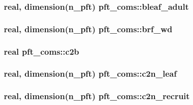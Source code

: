 \subsubsection[{bleaf\+\_\+adult}]{\setlength{\rightskip}{0pt plus 5cm}real, dimension(n\+\_\+pft) pft\+\_\+coms\+::bleaf\+\_\+adult}\label{namespacepft__coms_a032c88698720a94f7bdeff271ae39844}
\hypertarget{namespacepft__coms_aad5b7cd93696f04e149139562ce0f7be}{}
\subsubsection[{brf\+\_\+wd}]{\setlength{\rightskip}{0pt plus 5cm}real, dimension(n\+\_\+pft) pft\+\_\+coms\+::brf\+\_\+wd}\label{namespacepft__coms_aad5b7cd93696f04e149139562ce0f7be}
\hypertarget{namespacepft__coms_a2613e7dd1fa05af83d058d81f92946ec}{}
\subsubsection[{c2b}]{\setlength{\rightskip}{0pt plus 5cm}real pft\+\_\+coms\+::c2b}\label{namespacepft__coms_a2613e7dd1fa05af83d058d81f92946ec}
\hypertarget{namespacepft__coms_a62386599b26b4cf8d478b513f813d974}{}
\subsubsection[{c2n\+\_\+leaf}]{\setlength{\rightskip}{0pt plus 5cm}real, dimension(n\+\_\+pft) pft\+\_\+coms\+::c2n\+\_\+leaf}\label{namespacepft__coms_a62386599b26b4cf8d478b513f813d974}
\hypertarget{namespacepft__coms_ad105c123dc17ca1fb99476b476e035a4}{}
\subsubsection[{c2n\+\_\+recruit}]{\setlength{\rightskip}{0pt plus 5cm}real, dimension(n\+\_\+pft) pft\+\_\+coms\+::c2n\+\_\+recruit}\label{namespacepft__coms_ad105c123dc17ca1fb99476b476e035a4}
\hypertarget{namespacepft__coms_a4cd2632f30c0c38883e4191eb65e352b}{}
